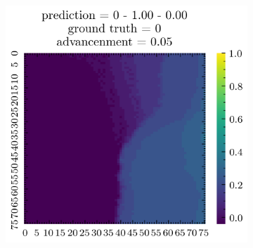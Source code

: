 \documentclass[../document.tex]{subfiles}
\begin{document}
\begin{figure}[H]
\begin{subfigure}[b]{0.19\textwidth}
    \end{subfigure}  
    \begin{subfigure}[b]{0.19\textwidth}
        \includegraphics[width=\linewidth]{../img/5/quarry/worst/patch-2d-4.png}
    \end{subfigure}  


\end{figure}
\end{document}
